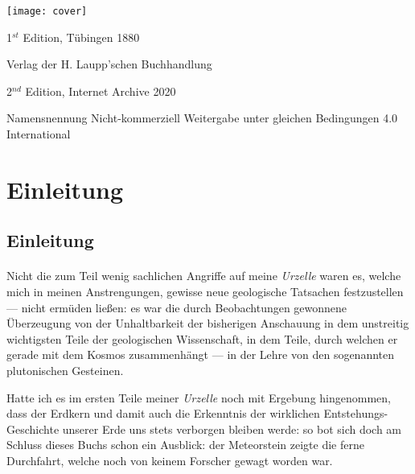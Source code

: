 \documentclass[a4paper, 12pt, oneside]{article}
\begin{document}
\begin{titlepage}
	\texttt{[image: cover]}
	
		
	\vspace{1\baselineskip} %
	
	1$^{st}$ Edition, Tübingen 1880 %
	
	{\small Verlag der H. Laupp'schen Buchhandlung } %

	\vspace{1\baselineskip} %

    2$^{nd}$ Edition, Internet Archive 2020 %
	
	{\small Namensnennung Nicht-kommerziell Weitergabe unter gleichen Bedingungen 4.0 International } %
\end{titlepage}
\setlength{\parskip}{1mm plus1mm minus1mm}
\setcounter{tocdepth}{2}
\setcounter{secnumdepth}{3}
\tableofcontents
\clearpage
\listoffigures
\clearpage
\section{Einleitung}
\subsection{Einleitung}
\paragraph{}
Nicht die zum Teil wenig sachlichen Angriffe auf meine \emph{Urzelle} waren es, welche mich in meinen Anstrengungen, gewisse neue geologische Tatsachen festzustellen — nicht ermüden ließen: es war die durch Beobachtungen gewonnene Überzeugung von der Unhaltbarkeit der bisherigen Anschauung in dem unstreitig wichtigsten Teile der geologischen Wissenschaft, in dem Teile, durch welchen er gerade mit dem Kosmos zusammenhängt — in der Lehre von den sogenannten plutonischen Gesteinen.

Hatte ich es im ersten Teile meiner \emph{Urzelle} noch mit Ergebung hingenommen, dass der Erdkern und damit auch die Erkenntnis der wirklichen Entstehungs-Geschichte unserer Erde uns stets verborgen bleiben werde: so bot sich doch am Schluss dieses Buchs schon ein Ausblick: der Meteorstein zeigte die ferne Durchfahrt, welche noch von keinem Forscher gewagt worden war.
\end{document}
